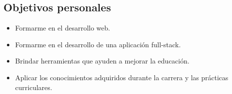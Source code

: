 \subsection{Objetivos personales}
\begin{itemize}
    \item Formarme en el desarrollo web.
    \item Formarme en el desarrollo de una aplicación full-stack.
    \item Brindar herramientas que ayuden a mejorar la educación.
    \item Aplicar los conocimientos adquiridos durante la carrera y las prácticas curriculares.
\end{itemize}

